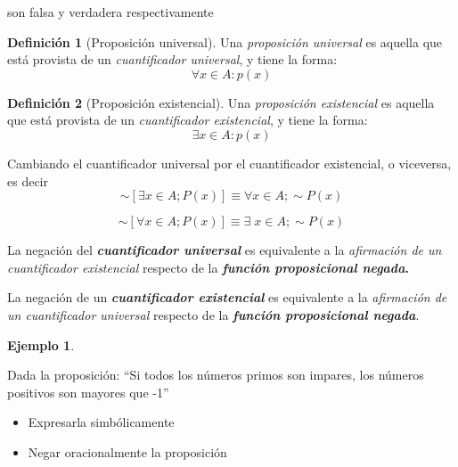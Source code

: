 \documentclass[
  16pt,
]{krantz}
\providecommand{\tightlist}{%
  \setlength{\itemsep}{0pt}\setlength{\parskip}{0pt}}
\theoremstyle{definition}
\newtheorem{definition}{Definición}[chapter]
\theoremstyle{definition}
\newtheorem{example}{Ejemplo}[chapter]
\theoremstyle{definition}
\theoremstyle{definition}
\theoremstyle{remark}
\begin{document}
son falsa y verdadera respectivamente

\begin{definition}[Proposición universal]
\protect\hypertarget{def:universal2}{}\label{def:universal2}Una \emph{proposición universal} es aquella que está provista de un \emph{cuantificador universal}, y tiene la forma: \[\forall x\in A:p(x)\]
\end{definition}

\begin{definition}[Proposición existencial]
\protect\hypertarget{def:existencial2}{}\label{def:existencial2}Una \emph{proposición existencial} es aquella que está provista de un \emph{cuantificador existencial}, y tiene la forma: \[\exists x\in A:p(x)\]
\end{definition}

Cambiando el cuantificador universal por el cuantificador existencial, o viceversa, es decir \[\sim[\exists x\in A; P(x)]\equiv\forall x\in A;\sim P(x)\]

\[
\sim\left[\forall  x\in A; P(x)\right]\equiv\exists\; x\in A;\sim P(x)
\]

La negación del \textbf{\emph{cuantificador universal}} es equivalente a la \emph{afirmación de un cuantificador existencial} respecto de la \textbf{\emph{función proposicional negada}.}

La negación de un \textbf{\emph{cuantificador existencial}} es equivalente a la \emph{afirmación de un cuantificador universal} respecto de la \textbf{\emph{función proposicional negada}}.

\begin{example}
\protect\hypertarget{exm:wwwwwwww}{}\label{exm:wwwwwwww}

Dada la proposición: ``Si todos los números primos son impa­res, los números positivos son mayores que -1''

\begin{itemize}
\tightlist
\item
  Expresarla simbólicamente
\item
  Negar oracionalmente la proposición
\end{itemize}

\end{example}
\end{document}
